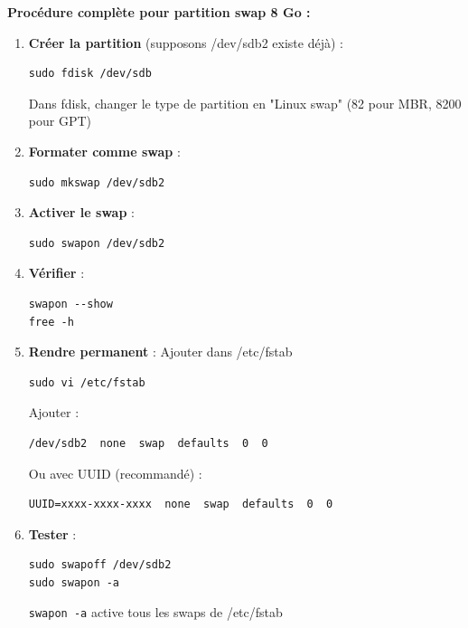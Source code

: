 \documentclass[12pt,a4paper]{article}
\begin{document}
\begin{answerbox}
\textbf{Procédure complète pour partition swap 8 Go :}

\begin{enumerate}
    \item \textbf{Créer la partition} (supposons /dev/sdb2 existe déjà) :
    \begin{lstlisting}
sudo fdisk /dev/sdb
    \end{lstlisting}
    Dans fdisk, changer le type de partition en "Linux swap" (82 pour MBR, 8200 pour GPT)
    
    \item \textbf{Formater comme swap} :
    \begin{lstlisting}
sudo mkswap /dev/sdb2
    \end{lstlisting}
    
    \item \textbf{Activer le swap} :
    \begin{lstlisting}
sudo swapon /dev/sdb2
    \end{lstlisting}
    
    \item \textbf{Vérifier} :
    \begin{lstlisting}
swapon --show
free -h
    \end{lstlisting}
    
    \item \textbf{Rendre permanent} : Ajouter dans /etc/fstab
    \begin{lstlisting}
sudo vi /etc/fstab
    \end{lstlisting}
    
    Ajouter :
    \begin{verbatim}
/dev/sdb2  none  swap  defaults  0  0
    \end{verbatim}
    
    Ou avec UUID (recommandé) :
    \begin{verbatim}
UUID=xxxx-xxxx-xxxx  none  swap  defaults  0  0
    \end{verbatim}
    
    \item \textbf{Tester} :
    \begin{lstlisting}
sudo swapoff /dev/sdb2
sudo swapon -a
    \end{lstlisting}
    \texttt{swapon -a} active tous les swaps de /etc/fstab
\end{enumerate}
\end{answerbox}
\end{document}
